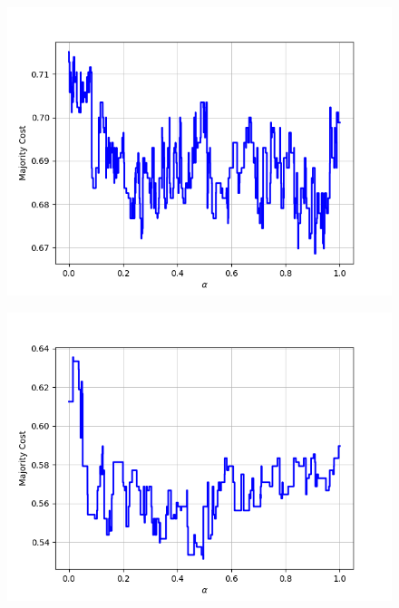 \begin{figure}[h]
\begin{minipage}{.19\textwidth}
  {\includegraphics[width=\linewidth]{plots/omniglot-intra-ac-cnn/Futurama}}
\end{minipage}
\begin{minipage}{.19\textwidth}
  \centering
  {\includegraphics[width=\linewidth]{plots/omniglot-intra-ac-cnn/Grantha}}
\end{minipage}
\begin{minipage}{.19\textwidth}
  \centering

\end{minipage}
\end{figure}
